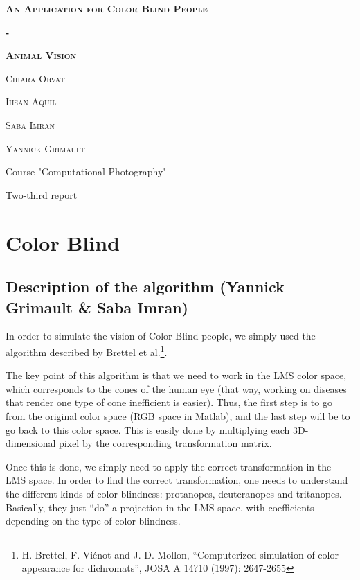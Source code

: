 \documentclass[12pt]{article}
\begin{document}
\begin{titlepage}
    \centering
    {\scshape\LARGE\textbf{An Application for Color Blind People}\par}
    {\scshape\LARGE\textbf{-}\par}
    {\scshape\LARGE\textbf{Animal Vision} \par}
    \vspace{2cm}
    \centering
    {\scshape\Large Chiara Orvati \par}
    \centering
    {\scshape\Large Ihsan Aquil \par}
    \centering
    {\scshape\Large Saba Imran \par}
    \centering
    {\scshape\Large Yannick Grimault \par}
    \vspace{3.5cm}
    {Course "Computational Photography" \par}
    \vspace{1cm}
    {Two-third report \par}
    \vfill
\end{titlepage}
\setlength\parindent{24pt}

\section{Color Blind}
\subsection{Description of the algorithm (Yannick Grimault \& Saba Imran)}

In order to simulate the vision of Color Blind people, we simply used the algorithm described by Brettel et al.\footnote{H. Brettel, F. Viénot and J. D. Mollon, ``Computerized simulation of color appearance for dichromats'', JOSA A 14?10 (1997): 2647-2655}.

The key point of this algorithm is that we need to work in the LMS color space, which corresponds to the cones of the human eye (that way, working on diseases that render one type of cone inefficient is easier). Thus, the first step is to go from the original color space (RGB space in Matlab), and the last step will be to go back to this color space. This is easily done by multiplying each 3D-dimensional pixel by the corresponding transformation matrix.

Once this is done, we simply need to apply the correct transformation in the LMS space. In order to find the correct transformation, one needs to understand the different kinds of color blindness: protanopes, deuteranopes and tritanopes. Basically, they just ``do'' a projection in the LMS space, with coefficients depending on the type of color blindness.
\end{document}
